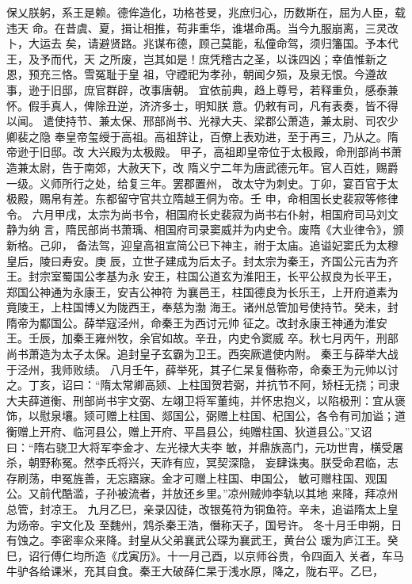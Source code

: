 \documentclass[12pt,UTF8]{ctexbook}
\begin{document}
保乂朕躬，系王是赖。德侔造化，功格苍旻，兆庶归心，历数斯在，屈为人臣，载违天
命。在昔虞、夏，揖让相推，苟非重华，谁堪命禹。当今九服崩离，三灵改卜，大运去
矣，请避贤路。兆谋布德，顾己莫能，私僮命驾，须归籓国。予本代王，及予而代，天
之所废，岂其如是！庶凭稽古之圣，以诛四凶；幸值惟新之恩，预充三恪。雪冤耻于皇
祖，守禋祀为孝孙，朝闻夕殒，及泉无恨。今遵故事，逊于旧邸，庶官群辟，改事唐朝。
宜依前典，趋上尊号，若释重负，感泰兼怀。假手真人，俾除丑逆，济济多士，明知朕
意。仍敕有司，凡有表奏，皆不得以闻。
遣使持节、兼太保、邢部尚书、光禄大夫、梁郡公萧造，兼太尉、司农少卿裴之隐
奉皇帝玺绶于高祖。高祖辞让，百僚上表劝进，至于再三，乃从之。隋帝逊于旧邸。改
大兴殿为太极殿。
甲子，高祖即皇帝位于太极殿，命刑部尚书萧造兼太尉，告于南郊，大赦天下，改
隋义宁二年为唐武德元年。官人百姓，赐爵一级。义师所行之处，给复三年。罢郡置州，
改太守为刺史。丁卯，宴百官于太极殿，赐帛有差。东都留守官共立隋越王侗为帝。壬
申，命相国长史裴寂等修律令。
六月甲戌，太宗为尚书令，相国府长史裴寂为尚书右仆射，相国府司马刘文静为纳
言，隋民部尚书萧瑀、相国府司录窦威并为内史令。废隋《大业律令》，颁新格。己卯，
备法驾，迎皇高祖宣简公已下神主，祔于太庙。追谥妃窦氏为太穆皇后，陵曰寿安。庚
辰，立世子建成为后太子。封太宗为秦王，齐国公元吉为齐王。封宗室蜀国公孝基为永
安王，柱国公道玄为淮阳王，长平公叔良为长平王，郑国公神通为永康王，安吉公神符
为襄邑王，柱国德良为长乐王，上开府道素为竟陵王，上柱国博乂为陇西王，奉慈为渤
海王。诸州总管加号使持节。癸未，封隋帝为酅国公。薛举寇泾州，命秦王为西讨元帅
征之。改封永康王神通为淮安王。壬辰，加秦王雍州牧，余官如故。辛丑，内史令窦威
卒。秋七月丙午，刑部尚书萧造为太子太保。追封皇子玄霸为卫王。西突厥遣使内附。
秦王与薛举大战于泾州，我师败绩。
八月壬午，薛举死，其子仁杲复僭称帝，命秦王为元帅以讨之。丁亥，诏曰：“隋太常卿高颎、上柱国贺若弼，并抗节不阿，矫枉无挠；司隶大夫薛道衡、刑部尚书宇文弼、左翊卫将军董纯，并怀忠抱义，以陷极刑：宜从褒饰，以慰泉壤。颎可赠上柱国、郯国公，弼赠上柱国、杞国公，各令有司加谥；道衡赠上开府、临河县公，赠上开府、平昌县公，纯赠柱国、狄道县公。”又诏曰：“隋右骁卫大将军李金才、左光禄大夫李
敏，并鼎族高门，元功世胄，横受屠杀，朝野称冤。然李氏将兴，天祚有应，冥契深隐，
妄肆诛夷。朕受命君临，志存刷荡，申冤旌善，无忘寤寐。金才可赠上柱国、申国公，
敏可赠柱国、观国公。又前代酷滥，子孙被流者，并放还乡里。”凉州贼帅李轨以其地
来降，拜凉州总管，封凉王。
九月乙巳，亲录囚徒，改银菟符为铜鱼符。辛未，追谥隋太上皇为炀帝。宇文化及
至魏州，鸩杀秦王浩，僭称天子，国号许。
冬十月壬申朔，日有蚀之。李密率众来降。封皇从父弟襄武公琛为襄武王，黄台公
瑗为庐江王。癸巳，诏行傅仁均所造《戊寅历》。十一月己酉，以京师谷贵，令四面入
关者，车马牛驴各给课米，充其自食。秦王大破薛仁杲于浅水原，降之，陇右平。乙巳，
\end{document}

